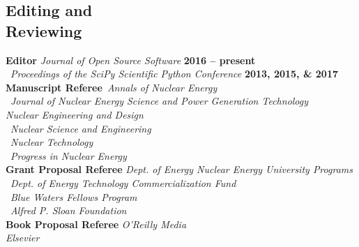 \documentclass[margin,line]{resume}
\begin{document}
\begin{resume}
    \section{\mysidestyle Editing and\\Reviewing}
    \textbf{Editor} \hfill \emph{Journal of Open Source Software} \textbf{2016 
    -- present}\\%
                    \mbox{}~\hfill \emph{Proceedings of the SciPy Scientific Python Conference} \textbf{2013, 2015, \& 2017}\vspace{2mm}\\%
    \textbf{Manuscript Referee}~\hfill\emph{Annals of Nuclear Energy}\\%
                            \mbox{}~\hfill \emph{Journal of Nuclear Energy Science and Power Generation Technology} \\%
                            \mbox{}\hfill \emph{Nuclear Engineering and Design}\\%
                            \mbox{}~\hfill\emph{Nuclear Science and Engineering}\\%
                            \mbox{}~\hfill\emph{Nuclear Technology}\\%
                            \mbox{}~\hfill\emph{Progress in Nuclear Energy}\vspace{2mm}\\%
    \textbf{Grant Proposal Referee} \hfill \emph{Dept. of Energy Nuclear Energy University Programs}\\%
                            \mbox{}~\hfill\emph{Dept. of Energy Technology Commercialization Fund}\\%
                            \mbox{}~\hfill\emph{Blue Waters Fellows Program}\vspace{2mm}\\%
                            \mbox{}~\hfill\emph{Alfred P. Sloan Foundation}\vspace{2mm}\\%
    \textbf{Book Proposal Referee} \hfill\emph{O'Reilly Media}\\%
                            \mbox{}\hfill\emph{Elsevier}\vspace{2mm}\\%

\end{resume}
\end{document}
